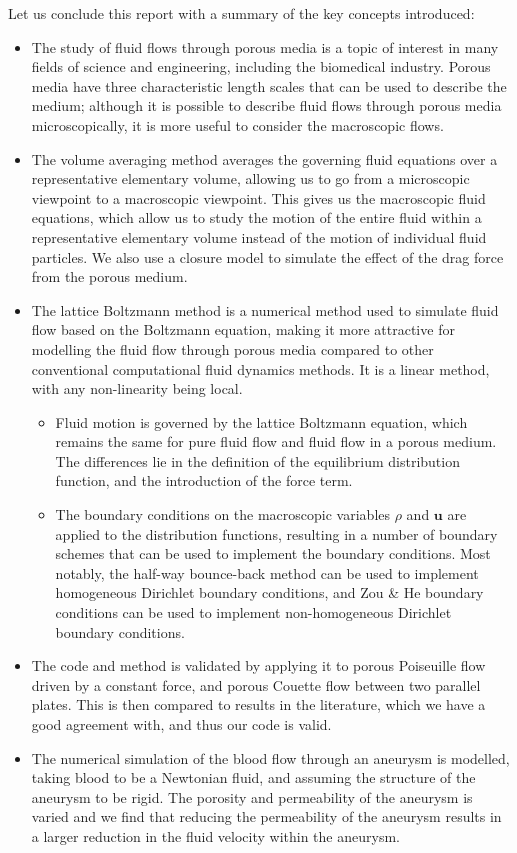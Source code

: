 \documentclass[a4paper, 11pt]{report}
\begin{document}
Let us conclude this report with a summary of the key concepts introduced:
\begin{itemize}
    \item The study of fluid flows through porous media is a topic of interest in many fields of science and engineering, including the biomedical industry. Porous media have three characteristic length scales that can be used to describe the medium; although it is possible to describe fluid flows through porous media microscopically, it is more useful to consider the macroscopic flows. 
    \item The volume averaging method averages the governing fluid equations over a representative elementary volume, allowing us to go from a microscopic viewpoint to a macroscopic viewpoint. This gives us the macroscopic fluid equations, which allow us to study the motion of the entire fluid within a representative elementary volume instead of the motion of individual fluid particles. We also use a closure model to simulate the effect of the drag force from the porous medium. 
    \item The lattice Boltzmann method is a numerical method used to simulate fluid flow based on the Boltzmann equation, making it more attractive for modelling the fluid flow through porous media compared to other conventional computational fluid dynamics methods. It is a linear method, with any non-linearity being local. 
    \begin{itemize}
        \item[{\fontfamily{cmtt}\selectfont{o}}] Fluid motion is governed by the lattice Boltzmann equation, which remains the same for pure fluid flow and fluid flow in a porous medium. The differences lie in the definition of the equilibrium distribution function, and the introduction of the force term. 
        \item[{\fontfamily{cmtt}\selectfont{o}}] The boundary conditions on the macroscopic variables $\rho$ and $\mathbf{u}$ are applied to the distribution functions, resulting in a number of boundary schemes that can be used to implement the boundary conditions. Most notably, the half-way bounce-back method can be used to implement homogeneous Dirichlet boundary conditions, and Zou \& He boundary conditions can be used to implement non-homogeneous Dirichlet boundary conditions.
    \end{itemize}
    \item The code and method is validated by applying it to porous Poiseuille flow driven by a constant force, and porous Couette flow between two parallel plates. This is then compared to results in the literature, which we have a good agreement with, and thus our code is valid.
    \item The numerical simulation of the blood flow through an aneurysm is modelled, taking blood to be a Newtonian fluid, and assuming the structure of the aneurysm to be rigid. The porosity and permeability of the aneurysm is varied and we find that reducing the permeability of the aneurysm results in a larger reduction in the fluid velocity within the aneurysm. 
\end{itemize}
\end{document}
